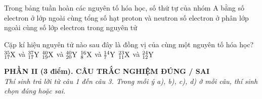 \documentclass[11pt,a4paper]{article}
\begin{document}
\begin{ex}
Trong bảng tuần hoàn các nguyên tố hóa học, số thứ tự của nhóm A bằng
\choice
{\True số electron ở lớp ngoài cùng}
{tổng số hạt proton và neutron}
{số electron ở phân lớp ngoài cùng}
{số lớp electron trong nguyên tử}

\end{ex}
\begin{ex}
Cặp kí hiệu nguyên tử nào sau đây là đồng vị của cùng một nguyên tố hóa học?
\choice
{\True $^{35}_{17}\ce{X}$ và $^{37}_{17}\ce{Y}$}
{$^{40}_{19}\ce{X}$ và $^{40}_{20}\ce{Y}$}
{$^{16}_{8}\ce{X}$ và $^{14}_{7}\ce{Y}$}
{$^{23}_{11}\ce{X}$ và $^{24}_{12}\ce{Y}$}

\end{ex}
\vspace{4pt}
\noindent
{\color{mainGreen}\textbf{\large PHẦN II (3 điểm). CÂU TRẮC NGHIỆM ĐÚNG / SAI}}\\
\textit{\small Thí sinh trả lời từ câu 1 đến câu 3. Trong mỗi ý a), b), c), d) ở mỗi câu, thí sinh chọn đúng hoặc sai.}
\vspace{2pt}
\end{document}
